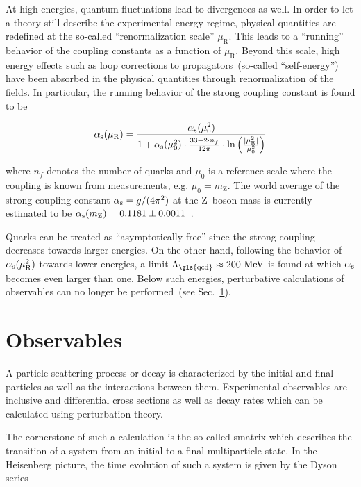 At high energies, quantum fluctuations lead to divergences as well. In order to let a theory still describe the experimental energy regime, physical quantities are redefined at the so-called ``renormalization scale'' $\mu_\mathrm{R}$. This leads to a ``running'' behavior of the coupling constants as a function of $\mu_\mathrm{R}$. Beyond this scale, high energy effects such as loop corrections to propagators~(so-called ``self-energy'') have been absorbed in the physical quantities through renormalization of the fields. In particular, the running behavior of the strong coupling constant is found to be 

\begin{equation}
{\alpha_\mathrm{s}}(\mu_\mathrm{R})=\frac{{\alpha_\mathrm{s}}(\mu_{0}^{2})}{1+{\alpha_\mathrm{s}}(\mu_\mathrm{0}^2)\cdot\tfrac{33-2\cdot n_f}{12\pi}\cdot\ln\Big(\tfrac{|\mu_\mathrm{R}^2|}{\mu_{0}^{2}}\Big)}
\end{equation}

where $n_f$ denotes the number of quarks and $\mu_{0}$ is a reference scale where the coupling is known from measurements, e.g. $\mu_{0}=m_\mathrm{Z}$. The world average of the strong coupling constant ${\alpha_\mathrm{s}}=g/(4\pi^2)$ at the $\mathrm{Z}$~boson mass is currently estimated to be ${\alpha_\mathrm{s}}(m_\mathrm{Z})=0.1181\pm0.0011$~\cite{Olive:2016xmw}. 

Quarks can be treated as ``asymptotically free'' since the strong coupling decreases towards larger energies. On the other hand, following the behavior of ${\alpha_\mathrm{s}}(\mu^2_\mathrm{R})$ towards lower energies, a limit $\Lambda_\mathrm{\gls{qcd}}\approx 200~\MeV$ is found at which ${\alpha_\mathrm{s}}$ becomes even larger than one. Below such energies, perturbative calculations of observables can no longer be performed~(see Sec.~\ref{sec:theory-observables}). 





\section{Observables}
\label{sec:theory-observables}

A particle scattering process or decay is characterized by the initial and final particles as well as the interactions between them. Experimental observables are inclusive and differential cross sections as well as decay rates which can be calculated using perturbation theory. 

The cornerstone of such a calculation is the so-called \gls{smatrix} which describes the transition of a system from an initial to a final multiparticle state. In the Heisenberg picture, the time evolution of such a system is given by the Dyson series

